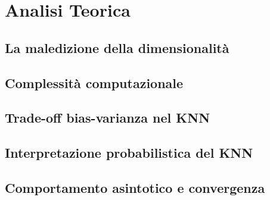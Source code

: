 \section{Analisi Teorica}
\subsection{La maledizione della dimensionalità}
\subsection{Complessità computazionale}
\subsection{Trade-off bias-varianza nel KNN}
\subsection{Interpretazione probabilistica del KNN}
\subsection{Comportamento asintotico e convergenza}
